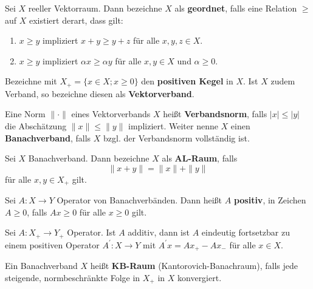 \begin{defi}[Vektorverband]
Sei $X$ reeller Vektorraum. Dann bezeichne $X$ als \textbf{geordnet}, falls eine  Relation $\geq$ auf $X$ existiert derart, dass gilt:
\begin{enumerate}
    \item $x\geq y$ impliziert $x+y\geq y+z$ für alle $x,y,z\in X$.
    \item $x\geq y$ impliziert $\alpha x\geq \alpha y$ für alle $x,y\in X$ und $\alpha\geq0$.
\end{enumerate}
Bezeichne mit $X_+ = \{x\in X; x\geq0\}$ den \textbf{positiven Kegel} in $X$. Ist $X$ zudem Verband, so bezeichne diesen als \textbf{Vektorverband}.
\end{defi}

\begin{defi}[Banachverband]
Eine Norm $\|\cdot\|$ eines Vektorverbands $X$ heißt \textbf{Verbandsnorm}, falls $|x|\leq |y|$ die Abschätzung $\|x\|\leq \|y\|$ impliziert. Weiter nenne $X$ einen \textbf{Banachverband}, falls $X$ bzgl. der Verbandsnorm vollständig ist.
\end{defi}

\begin{defi}[AL-Raum]
Sei $X$ Banachverband. Dann bezeichne $X$ als \textbf{AL-Raum}, falls \begin{equation}\label{eq:}
\|x+y\|=\|x\|+\|y\|
\end{equation}
für alle $x,y\in X_+$ gilt.
\end{defi}

\begin{defi}
Sei $A\colon X\to Y$ Operator von Banachverbänden. Dann heißt $A$ \textbf{positiv}, in Zeichen $A\geq0$, falls $Ax\geq0$ für alle $x\geq0$ gilt.
\end{defi}

\begin{prop}[Fortsetzbarkeit]\cite{banasiak_arlotti_2006}\label{Fortsetzbarkeit positiver, additiver Operatoren}
Sei $A\colon X_+\to Y_+$ Operator. Ist $A$ additiv, dann ist $A$ eindeutig fortsetzbar zu einem positiven Operator $A^\prime\colon X\to Y$ mit $A^\prime x = Ax_+ - Ax_-$ für alle $x\in X$.
\end{prop}



\begin{defi}[KB-Raum]
Ein Banachverband $X$ heißt \textbf{KB-Raum} (Kantorovich-Banachraum), falls jede steigende, normbeschränkte Folge in $X_+$ in $X$ konvergiert.
\end{defi}

